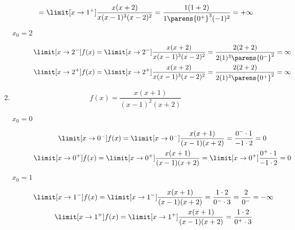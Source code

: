 \begin{enumerate}[label={\alph*)}]
    \item
        \begin{equation*}
            f(x) = \frac{x(x + 1)}{(x - 1)^2(x + 2)}
        \end{equation*}
        \begin{description}
            \item[\(x_0 = 0\)]
                \begin{gather*}
                    \limit[x \to 0^-] f(x)
                        = \limit[x \to 0^-] \frac{x(x + 1)}{(x - 1)(x + 2)}
                        = \frac{0^- \cdot 1}{-1 \cdot 2}
                        = 0\\
                    \limit[x \to 0^+] f(x)
                        = \limit[x \to 0^+] \frac{x(x + 1)}{(x - 1)(x + 2)}
                        = \limit[x \to 0^+] \frac{0^+ \cdot 1}{-1 \cdot 2}
                        = 0
                \end{gather*}
            \item[\(x_0 = 1\)]
                \begin{gather*}
                    \limit[x \to 1^-] f(x)
                        = \limit[x \to 1^-] \frac{x(x + 1)}{(x - 1)(x + 2)}
                        = \frac{1 \cdot 2}{0^- \cdot 3}
                        = \frac{2}{0^-}
                        = -\infty\\
                    \limit[x \to 1^+] f(x)
                        = \limit[x \to 1^+] \frac{x(x + 1)}{(x - 1)(x + 2)}
                        = \frac{1 \cdot 2}{0^+ \cdot 3}

\end{gather*}
\end{description}
\end{enumerate}
